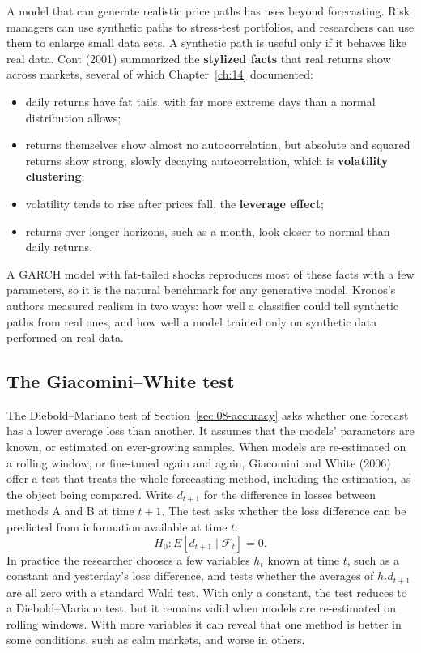 A model that can generate realistic price paths has uses beyond forecasting. Risk managers can use synthetic paths to stress-test portfolios, and researchers can use them to enlarge small data sets. A synthetic path is useful only if it behaves like real data. Cont (2001) summarized the \textbf{stylized facts} that real returns show across markets, several of which Chapter~\ref{ch:14} documented:

\begin{itemize}
  \item daily returns have fat tails, with far more extreme days than a normal distribution allows;
  \item returns themselves show almost no autocorrelation, but absolute and squared returns show strong, slowly decaying autocorrelation, which is \textbf{volatility clustering};
  \item volatility tends to rise after prices fall, the \textbf{leverage effect};
  \item returns over longer horizons, such as a month, look closer to normal than daily returns.
\end{itemize}

A GARCH model with fat-tailed shocks reproduces most of these facts with a few parameters, so it is the natural benchmark for any generative model. Kronos's authors measured realism in two ways: how well a classifier could tell synthetic paths from real ones, and how well a model trained only on synthetic data performed on real data.

\subsection{The Giacomini--White test}

The Diebold--Mariano test of Section~\ref{sec:08-accuracy} asks whether one forecast has a lower average loss than another. It assumes that the models' parameters are known, or estimated on ever-growing samples. When models are re-estimated on a rolling window, or fine-tuned again and again, Giacomini and White (2006) offer a test that treats the whole forecasting method, including the estimation, as the object being compared. Write $d_{t+1}$ for the difference in losses between methods A and B at time $t+1$. The test asks whether the loss difference can be predicted from information available at time $t$:
\begin{equation}
  H_0: E\left[d_{t+1} \mid \mathcal{F}_t\right] = 0.
  \label{eq:22-gw}
\end{equation}
In practice the researcher chooses a few variables $h_t$ known at time $t$, such as a constant and yesterday's loss difference, and tests whether the averages of $h_t d_{t+1}$ are all zero with a standard Wald test. With only a constant, the test reduces to a Diebold--Mariano test, but it remains valid when models are re-estimated on rolling windows. With more variables it can reveal that one method is better in some conditions, such as calm markets, and worse in others.

